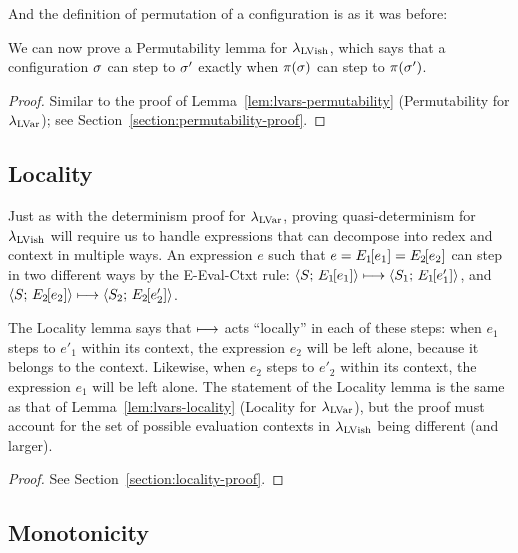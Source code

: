 And the definition of permutation of a configuration is as it was before:

\DefPermutationConfiguration

We can now prove a Permutability lemma for $\lambda_{\textrm{LVish}}$, which says
that a configuration $\sigma$ can step to $\sigma'$ exactly when
$\pi(\sigma)$ can step to $\pi(\sigma')$.

\LemPermutability
\begin{proof}
  Similar to the proof of Lemma~\ref{lem:lvars-permutability}
  (Permutability for $\lambda_{\textrm{LVar}}$); see
  Section~\ref{section:permutability-proof}.
\end{proof}


\subsection{Locality}

Just as with the determinism proof for $\lambda_{\textrm{LVar}}$, proving
quasi-determinism for $\lambda_{\textrm{LVish}}$ will require us to handle
expressions that can decompose into redex and context in multiple
ways.  An expression $e$ such that $e = E_1\hspace{-1mm}\left[e_1\right] =
E_2\hspace{-1mm}\left[e_2\right]$ can step in two different ways by the {\sc
  E-Eval-Ctxt} rule: $\langle S;\, E_1\hspace{-1mm}\left[e_1\right] \rangle \longmapsto
\langle S_1;\, E_1\hspace{-1mm}\left[e'_1\right] \rangle$, and
$\langle S;\, E_2\hspace{-1mm}\left[e_2\right] \rangle \longmapsto
\langle S_2;\, E_2\hspace{-1mm}\left[e'_2\right] \rangle$.

The Locality lemma says that $\longmapsto$ acts ``locally'' in each of
these steps: when $e_1$ steps to $e'_1$ within its context, the
expression $e_2$ will be left alone, because it belongs to the
context.  Likewise, when $e_2$ steps to $e'_2$ within its context, the
expression $e_1$ will be left alone.  The statement of the Locality
lemma is the same as that of Lemma~\ref{lem:lvars-locality} (Locality
for $\lambda_{\textrm{LVar}}$), but the proof must account for the set of possible
evaluation contexts in $\lambda_{\textrm{LVish}}$ being different (and larger).

\LemLocality
\begin{proof}
   See
  Section~\ref{section:locality-proof}.
\end{proof}

\subsection{Monotonicity}\label{subsection:quasi-monotonicity}

